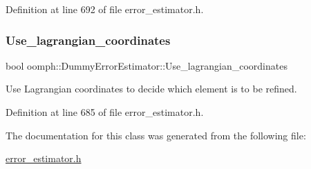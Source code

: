 Definition at line 692 of file error\+\_\+estimator.\+h.

\mbox{\label{classoomph_1_1DummyErrorEstimator_a052e3d319921a682b7fa0fef66496625}} 
\subsubsection{\texorpdfstring{Use\+\_\+lagrangian\+\_\+coordinates}{Use\_lagrangian\_coordinates}}
{\footnotesize\ttfamily bool oomph\+::\+Dummy\+Error\+Estimator\+::\+Use\+\_\+lagrangian\+\_\+coordinates\hspace{0.3cm}{\ttfamily [private]}}



Use Lagrangian coordinates to decide which element is to be refined. 



Definition at line 685 of file error\+\_\+estimator.\+h.



The documentation for this class was generated from the following file\+:\begin{DoxyCompactItemize}
\item 
\hyperlink{error__estimator_8h}{error\+\_\+estimator.\+h}\end{DoxyCompactItemize}
